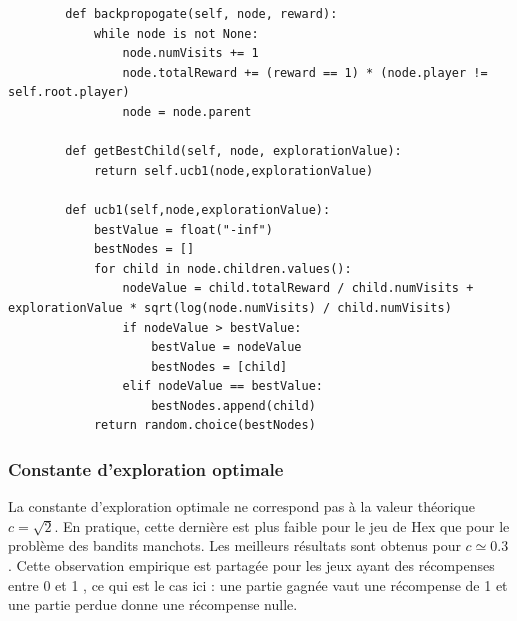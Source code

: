 \documentclass[a4paper]{article}
\theoremstyle{definition}
\begin{document}
\begin{lstlisting}
		def backpropogate(self, node, reward):
			while node is not None:
				node.numVisits += 1
				node.totalReward += (reward == 1) * (node.player != self.root.player)
				node = node.parent
		
		def getBestChild(self, node, explorationValue):
			return self.ucb1(node,explorationValue)
		
		def ucb1(self,node,explorationValue):
			bestValue = float("-inf")
			bestNodes = []
			for child in node.children.values():
				nodeValue = child.totalReward / child.numVisits + explorationValue * sqrt(log(node.numVisits) / child.numVisits)
				if nodeValue > bestValue:
					bestValue = nodeValue
					bestNodes = [child]
				elif nodeValue == bestValue:
					bestNodes.append(child)
			return random.choice(bestNodes)
\end{lstlisting}

\newpage

\subsubsection{Constante d'exploration optimale}

La constante d'exploration optimale ne correspond pas à la valeur théorique $c=\sqrt{2}$. En pratique, cette dernière est plus faible pour le jeu de Hex que pour le problème des bandits manchots. Les meilleurs résultats sont obtenus pour $c \simeq 0.3$. Cette observation empirique est partagée pour les jeux ayant des récompenses entre 0 et 1 \cite{expcst}, ce qui est le cas ici : une partie gagnée vaut une récompense de 1 et une partie perdue donne une récompense nulle.
\end{document}
